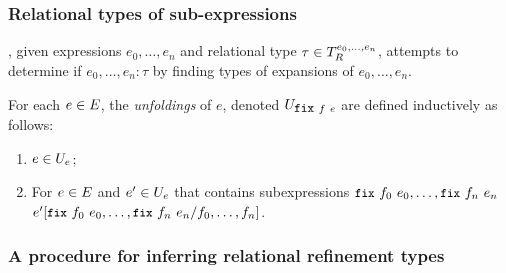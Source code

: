 \subsubsection{Relational types of sub-expressions}
\label{sec:bnd-unfoldings}
%
\sys, given expressions $e_0, \ldots, e_n$ and relational type
$\tau \in T_{R}^{e_0, \ldots, e_n}$, attempts to determine if
$e_0, \ldots, e_n : \tau$ by finding types of expansions of
$e_0, \ldots, e_n$.
%
\begin{defn}
  \label{defn:unfoldings}
  For each $e \in E$, the \emph{unfoldings} of $e$, denoted
  $\unfoldings{ \fix{f}{e} }$ are defined inductively as follows:
  \begin{enumerate}
  \item %
    $e \in U_{ e }$;
  \item %
    For $e \in E$ and $e' \in U_{e}$ that contains
    subexpressions $\fix{f_0}{e_0}, \ldots, \fix{f_n}{e_n}$
    $\replace{e'}{f_0, \ldots, f_n}{ \fix{f_0}{e_0}, \ldots,
      \fix{f_n}{e_n} }$.
  \end{enumerate}
\end{defn}
%

\subsubsection{A procedure for inferring relational refinement types}
\label{sec:infer-alg}

